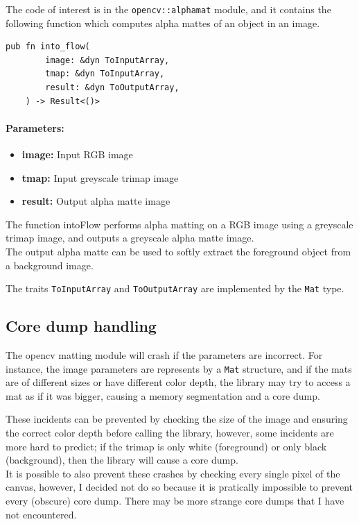 \documentclass[a4paper]{article}
\begin{document}
The code of interest is in the \texttt{opencv::alphamat} module,
and it contains the following function which computes alpha mattes of an object in an image.

\begin{lstlisting}[style=Rust, style=boxed]
    pub fn into_flow(
        image: &dyn ToInputArray,
        tmap: &dyn ToInputArray,
        result: &dyn ToOutputArray,
    ) -> Result<()>
\end{lstlisting}

\paragraph{Parameters:}
\begin{itemize}
    \item \textbf{image:} Input RGB image
    \item \textbf{tmap:} Input greyscale trimap image
    \item \textbf{result:} Output alpha matte image
\end{itemize}

The function intoFlow performs alpha matting on a RGB image
using a greyscale trimap image, and outputs a greyscale alpha matte image. \\
The output alpha matte can be used to softly extract the foreground
object from a background image. %

The \gls{trait}s \texttt{ToInputArray} and \texttt{ToOutputArray}
are implemented by the \texttt{Mat} type.

\pagebreak

\subsection{Core dump handling}

The opencv matting module will crash if the parameters
are incorrect. For instance, the image parameters are represents by a
\texttt{Mat} structure, and if the mats are of different sizes or have different color depth,
the library may try to access a mat as if it was bigger, causing a memory segmentation
and a core dump.

These incidents can be prevented by checking the size of the image and ensuring the correct
color depth before calling the library, however, some incidents are more hard
to predict; if the trimap is only white (foreground) or only black (background),
then the library will cause a core dump. \\
It is possible to also prevent these crashes by checking every single pixel
of the canvas, however, I decided not do so because it is pratically impossible
to prevent every (obscure) core dump. There may be more strange core dumps
that I have not encountered.
\end{document}
